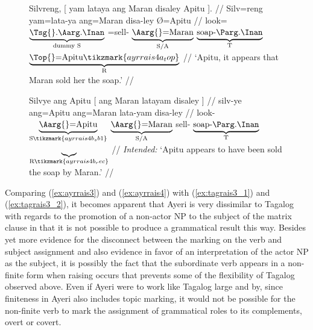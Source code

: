 \begin{figure}
\pex\label{ex:ayrrais4}
\a\label{ex:ayrrais4_1}\begingl[aboveglcskip=1.5em]
	\gla Silvreng, \textup{[} {yam lataya} {ang Maran} disaley Apitu
		\textup{]}. //
	\glb Silv=reng {} yam=lata-ya ang=Maran disa-ley Ø=Apitu {} //
	\glc look=$\underbrace{\text{\smash{\Tsg{}}.\AargI{}}}_{\text{dummy S}}$
		{}
		\DatT{}=sell-\TsgM{}%
		$\underbrace{\text{\Aarg{}=Maran}}_{\text{S/A}}$
		$\underbrace{\text{\smash{soap}-\PargI{}}}_{\text{T}}$
		$\underbrace{\text{\Top{}=\smash{Apitu}}%
			\tikzmark{ayrrais4a_top}%
		}_{\text{R}}$
		{}
		//
	\glft `Apitu, it appears that Maran sold her the soap.' //
\endgl
{}

\a\label{ex:ayrrais4_2}\ljudge*%
\begingl[aboveglftskip=1.75em]
	\gla Silvye {ang Apitu} \textup{[} {ang Maran} latayam disaley {}
		\textup{]} //
	\glb silv-ye ang=Apitu {} ang=Maran lata-yam disa-ley {} {} //
	\glc look-\TsgF{}
		$\underbrace{\text{\Aarg{}=\smash{Apitu}}}_{\text{S}%
			\tikzmark{ayrrais4b_sb1}%
		}$
		{}
		$\underbrace{\text{\Aarg{}=Maran}}_{\text{S/A}}$
		sell-\Ptcp{} 
		$\underbrace{\text{\smash{soap}-\PargI{}}}_{\text{T}}$
		$\underbrace{}_{\text{R}%
			\tikzmark{ayrrais4b_rec}%
		}$
		{} //
	\glft \textit{Intended:} `Apitu appears to have been sold the soap by
		Maran.' //
\endgl
{}

\xe
\end{figure}

Comparing (\ref{ex:ayrrais3}) and (\ref{ex:ayrrais4}) with
(\ref{ex:tagrais3_1}) and (\ref{ex:tagrais3_2}), it becomes apparent that Ayeri
is very dissimilar to Tagalog with regards to the promotion of a non-actor NP
to the subject of the matrix clause in that it is not possible to produce a
grammatical result this way. Besides yet more evidence for the disconnect
between the marking on the verb and subject assignment and also evidence in
favor of an interpretation of the actor NP as the subject, it is possibly the
fact that the subordinate verb appears in a non-finite form when raising occurs
that prevents some of the flexibility of Tagalog observed above. Even if Ayeri
were to work like Tagalog large and by, since finiteness in Ayeri also includes
topic marking, it would not be possible for the non-finite verb to mark the
assignment of grammatical roles to its complements, overt or covert.

